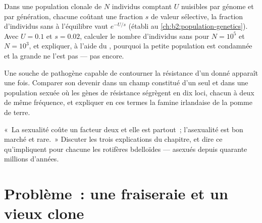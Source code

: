 \begin{exercise}[$\star\star\star$]\label{exo:b2:asexual-reproduction:10}
Dans une population clonale de $N$ individus comptant $U$ 
nuisibles par génome et par génération, chacune coûtant une fraction $s$
de valeur sélective, la fraction d'individus sans  à l'équilibre
vaut $e^{-U/s}$ (établi au \cref{ch:b2:population-genetics}). Avec $U =
0.1$ et $s = 0.02$, calculer le nombre d'individus sans  pour
$N = 10^{5}$ et $N = 10^{3}$, et expliquer, à l'aide du , pourquoi la petite population est condamnée et la grande ne
l'est pas --- pas encore.
\end{exercise}

\begin{exercise}[$\star\star\star$]\label{exo:b2:asexual-reproduction:11}
Une souche de pathogène capable de contourner la résistance d'un
 donné apparaît une fois. Comparer son devenir dans un champ
constitué d'un seul  et dans une population sexuée où les gènes de
résistance ségrègent en dix loci, chacun à deux  de même
fréquence, et expliquer en ces termes la famine irlandaise de la pomme
de terre.
\end{exercise}

\begin{exercise}[$\star\star\star$]\label{exo:b2:asexual-reproduction:12}
«~La sexualité coûte un facteur deux et elle est partout~; l'asexualité
est bon marché et rare.~» Discuter les trois explications du chapitre,
et dire ce qu'impliquent pour chacune les rotifères bdelloïdes ---
asexués depuis quarante millions d'années.
\end{exercise}

\section{Problème~: une fraiseraie et un vieux clone}

